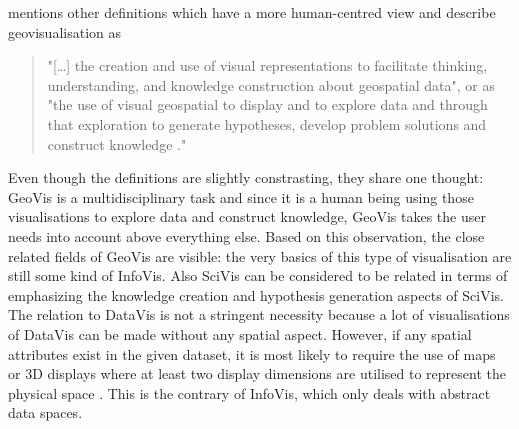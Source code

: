\begin{enumerate}
\citeauthor{Noellenburg2007} mentions other definitions which have a more human-centred view and describe geovisualisation as
\begin{quote}
"[\ldots] the creation and use of visual representations to facilitate thinking, understanding, and knowledge construction about geospatial data", or as "the use of visual geospatial to display and to explore data and through that exploration to generate hypotheses, develop problem solutions and construct knowledge ."
\end{quote}

Even though the definitions are slightly constrasting, they share one thought: \ac{GeoVis} is a multidisciplinary task and since it is a human being using those visualisations to explore data and construct knowledge, \ac{GeoVis} takes the user needs into account above everything else.
Based on this observation, the close related fields of \ac{GeoVis} are visible: the very basics of this type of visualisation are still some kind of \ac{InfoVis}. Also \ac{SciVis} can be considered to be related in terms of emphasizing the knowledge creation and hypothesis generation aspects of \ac{SciVis}. The relation to \ac{DataVis} is not a stringent necessity because a lot of visualisations of \ac{DataVis} can be made without any spatial aspect. However, if any spatial attributes exist in the given dataset, it is most likely to require the use of maps or 3D displays where at least two display dimensions are utilised to represent the physical space .
This is the contrary of \ac{InfoVis}, which only deals with abstract data spaces.
\end{enumerate}